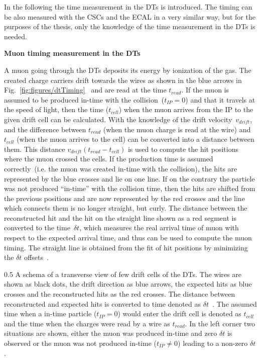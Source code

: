 In the following the time measurement in the DTs is introduced. The timing can be also measured with the CSCs and the ECAL in a very similar way, but for the purposes of the thesis, only the knowledge of the time measurement in the DTs is needed.


\textbf{Muon timing measurement in the DTs~\label{sec:muonTiming}}

A muon going through the DTs deposits its energy by ionization of the gas. The created charge carriers drift towards the wires as shown in the blue arrows in Fig.~\ref{fig:figures/dtTiming}~\cite{Traczyk:1365029} and are read at the time $t_{read}$. If the muon is assumed to be produced in-time with the collision~($t_{IP} = 0$) and that it travels at the speed of light, then the time ($t_{cell}$) when the muon arrives from the IP to the given drift cell can be calculated. With the knowledge of the drift velocity~$v_{drift}$, and the difference between $t_{read}$ (when the muon charge is read at the wire) and $t_{cell}$ (when the muon arrives to the cell) can be converted into a distance between them. This distance $ v_{drift} (t_{read} - t_{cell})$  is used to compute the hit positions where the muon crossed the cells. If the production time is assumed correctly~(i.e. the muon was created in-time with the collision), the hits are represented by the blue crosses and lie on one line. If on the contrary the particle was not produced ``in-time'' with the collision time, then the hits are shifted from the previous positions and are now represented by the red crosses and the line which connects them is no longer straight, but curly. The distance between the reconstructed hit and the hit on the straight line shown as a red segment is converted to the time~$\delta t$, which measures the real arrival time of muon with respect to the expected arrival time, and thus can be used to compute the muon timing. The straight line is obtained from the fit of hit positions by minimizing the $\delta t$ offsets~\cite{Traczyk:1365029}.


                 {0.5}       %
                 { A schema of a transverse view of few drift cells of the DTs. The wires are shown as black dots, the drift direction as blue arrows, the expected hits as blue crosses and the reconstructed hits as the red crosses. The distance between reconstructed and expected hits is converted to time denoted as $\delta t$~\cite{Traczyk:1365029}. The assumed time when a in-time particle ($t_{IP} = 0$) would enter the drift cell is denoted as $t_{cell}$ and the time when the charges were read by a wire as $t_{read}$. In the left corner two situations are shown, either the muon was produced in-time and zero $\delta t$ is observed or the muon was not produced in-time ($t_{IP} \neq 0$) leading to a non-zero $\delta t$. }

